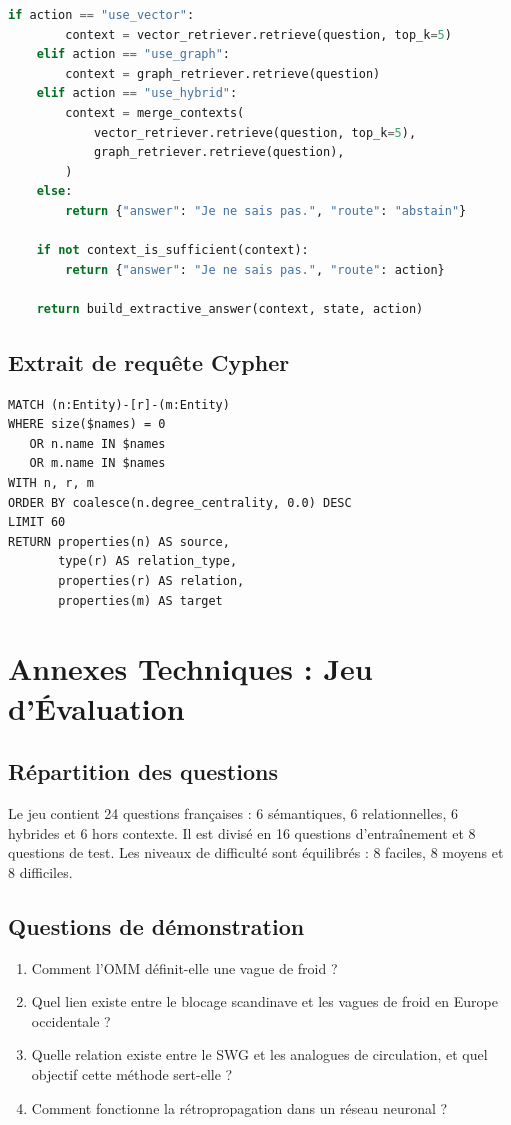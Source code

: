 \documentclass[12pt,a4paper,oneside]{report}
\begin{document}
\begin{appendices}
\begin{lstlisting}[style=code,language=Python]
    if action == "use_vector":
        context = vector_retriever.retrieve(question, top_k=5)
    elif action == "use_graph":
        context = graph_retriever.retrieve(question)
    elif action == "use_hybrid":
        context = merge_contexts(
            vector_retriever.retrieve(question, top_k=5),
            graph_retriever.retrieve(question),
        )
    else:
        return {"answer": "Je ne sais pas.", "route": "abstain"}

    if not context_is_sufficient(context):
        return {"answer": "Je ne sais pas.", "route": action}

    return build_extractive_answer(context, state, action)
\end{lstlisting}

\section{Extrait de requête Cypher}
\begin{lstlisting}[style=code]
MATCH (n:Entity)-[r]-(m:Entity)
WHERE size($names) = 0
   OR n.name IN $names
   OR m.name IN $names
WITH n, r, m
ORDER BY coalesce(n.degree_centrality, 0.0) DESC
LIMIT 60
RETURN properties(n) AS source,
       type(r) AS relation_type,
       properties(r) AS relation,
       properties(m) AS target
\end{lstlisting}

\chapter{Annexes Techniques : Jeu d'Évaluation}
\section{Répartition des questions}
Le jeu contient 24 questions françaises : 6 sémantiques, 6 relationnelles, 6 hybrides et 6 hors contexte. Il est divisé en 16 questions d'entraînement et 8 questions de test. Les niveaux de difficulté sont équilibrés : 8 faciles, 8 moyens et 8 difficiles.

\section{Questions de démonstration}
\begin{enumerate}
  \item Comment l'OMM définit-elle une vague de froid ?
  \item Quel lien existe entre le blocage scandinave et les vagues de froid en Europe occidentale ?
  \item Quelle relation existe entre le SWG et les analogues de circulation, et quel objectif cette méthode sert-elle ?
  \item Comment fonctionne la rétropropagation dans un réseau neuronal ?
\end{enumerate}


\end{appendices}
\end{document}

